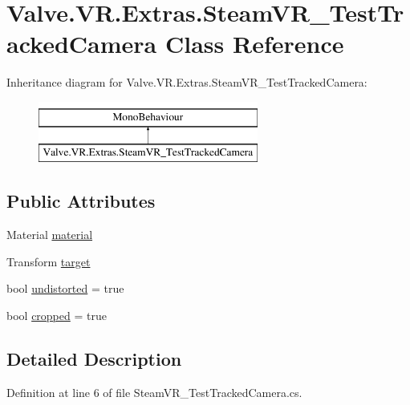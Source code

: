 \hypertarget{class_valve_1_1_v_r_1_1_extras_1_1_steam_v_r___test_tracked_camera}{}\section{Valve.\+V\+R.\+Extras.\+Steam\+V\+R\+\_\+\+Test\+Tracked\+Camera Class Reference}
\label{class_valve_1_1_v_r_1_1_extras_1_1_steam_v_r___test_tracked_camera}
Inheritance diagram for Valve.\+V\+R.\+Extras.\+Steam\+V\+R\+\_\+\+Test\+Tracked\+Camera\+:\begin{figure}[H]
\begin{center}
\leavevmode
\includegraphics[height=2.000000cm]{class_valve_1_1_v_r_1_1_extras_1_1_steam_v_r___test_tracked_camera}
\end{center}
\end{figure}
\subsection*{Public Attributes}
\begin{DoxyCompactItemize}
\item 
Material \mbox{\hyperlink{class_valve_1_1_v_r_1_1_extras_1_1_steam_v_r___test_tracked_camera_a6b4429622f96f91ff1c336bd4245d18b}{material}}
\item 
Transform \mbox{\hyperlink{class_valve_1_1_v_r_1_1_extras_1_1_steam_v_r___test_tracked_camera_ab4588b1d0457401522efac2cf0235731}{target}}
\item 
bool \mbox{\hyperlink{class_valve_1_1_v_r_1_1_extras_1_1_steam_v_r___test_tracked_camera_ae0bb1f5539c076d75d819f2b465ad58b}{undistorted}} = true
\item 
bool \mbox{\hyperlink{class_valve_1_1_v_r_1_1_extras_1_1_steam_v_r___test_tracked_camera_a02185d9d3cdd4a49b522a4b7e16ed23f}{cropped}} = true
\end{DoxyCompactItemize}


\subsection{Detailed Description}


Definition at line 6 of file Steam\+V\+R\+\_\+\+Test\+Tracked\+Camera.\+cs.



